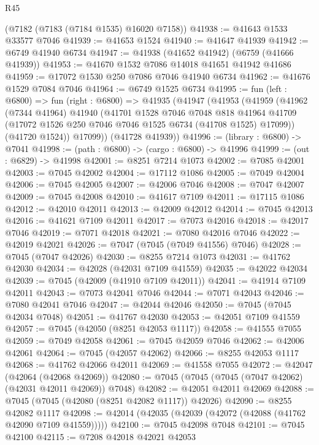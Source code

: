 \begin{lexlean}{R45}
\begin{coremodule}
{    (@7182 (@7183 (@7184 @1535) @16020 @7158))
@41938 := @41643 @1533 @33577 @7046
@41939 := @41653 @1524
@41940 := @41647 @41939
@41942 := @6749 @41940 @6734
@41947 := @41938 (@41652 @41942) (@6759 (@41666 @41939))
@41953 := @41670 @1532 @7086 @14018 @41651 @41942 @41686
@41959 := @17072 @1530 @250 @7086 @7046 @41940 @6734
@41962 := @41676 @1529 @7084 @7046
@41964 := @6749 @1525 @6734
@41995 := fun (left : @6800) =>
  fun (right : @6800) =>
  @41935
    (@41947
      (@41953
        (@41959
          (@41962
            (@7344 @41964)
            @41940
            (@41701
              @1528
              @7046
              @7048
              @818
              @41964
              @41709
              (@17072 @1526 @250 @7046 @7046 @1525 @6734 (@41708 @1525) @17099))
            (@41720 @1524))
          @17099))
      (@41728 @41939))
@41996 := (library : @6800) -> @7041
@41998 := (path : @6800) -> (cargo : @6800) -> @41996
@41999 := (out : @6829) -> @41998
@42001 := @8251 @7214 @1073
@42002 := @7085 @42001
@42003 := @7045 @42002
@42004 := @17112 @1086
@42005 := @7049 @42004
@42006 := @7045 @42005
@42007 := @42006 @7046
@42008 := @7047 @42007
@42009 := @7045 @42008
@42010 := @41617 @7109
@42011 := @17115 @1086
@42012 := @42010 @42011
@42013 := @42009 @42012
@42014 := @7045 @42013
@42016 := @41621 @7109 @42011
@42017 := @7073 @42016
@42018 := @42017 @7046
@42019 := @7071 @42018
@42021 := @7080 @42016 @7046
@42022 := @42019 @42021
@42026 := @7047 (@7045 (@7049 @41556) @7046)
@42028 := @7045 (@7047 @42026)
@42030 := @8255 @7214 @1073
@42031 := @41762 @42030
@42034 := @42028 (@42031 @7109 @41559)
@42035 := @42022 @42034
@42039 := @7045 (@42009 (@41910 @7109 @42011))
@42041 := @41914 @7109 @42011
@42043 := @7073 @42041 @7046
@42044 := @7071 @42043
@42046 := @7080 @42041 @7046
@42047 := @42044 @42046
@42050 := @7045 (@7045 @42034 @7048)
@42051 := @41767 @42030
@42053 := @42051 @7109 @41559
@42057 := @7045 (@42050 (@8251 @42053 @1117))
@42058 := @41555 @7055
@42059 := @7049 @42058
@42061 := @7045 @42059 @7046
@42062 := @42006 @42061
@42064 := @7045 (@42057 @42062)
@42066 := @8255 @42053 @1117
@42068 := @41762 @42066 @42011
@42069 := @41558 @7055
@42072 := @42047 (@42064 (@42068 @42069))
@42080 := @7045 (@7045 (@7045 (@7047 @42062) (@42031 @42011 @42069)) @7048)
@42082 := @42051 @42011 @42069
@42088 := @7045 (@7045 (@42080 (@8251 @42082 @1117)) @42026)
@42090 := @8255 @42082 @1117
@42098 := @42014 (@42035 (@42039 (@42072 (@42088 (@41762 @42090 @7109 @41559)))))
@42100 := @7045 @42098 @7048
@42101 := @7045 @42100
@42115 := @7208
    @42018
    @42021
    @42053
}
\end{coremodule}
\end{lexlean}
